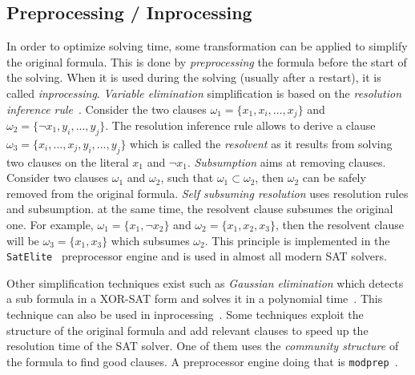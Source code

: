 \subsection{Preprocessing / Inprocessing}
In order to optimize solving time, some transformation can be applied to simplify the original formula.
This is done by \emph{preprocessing} the formula before the start of the solving.
When it is used during the solving (usually after a restart), it is called \emph{inprocessing}.
\emph{Variable elimination} simplification is based on the \emph{resolution inference rule}~\cite{robinson1965machine}.
Consider the two clauses $\omega_1 = \{x_1, x_i, ..., x_j \}$ and $\omega_2 = \{\neg x_1, y_i, ..., y_j\}$.
The resolution inference rule allows to derive a clause $\omega_3 = \{x_i, ..., x_j, y_i, ..., y_j\}$ which is called
the \emph{resolvent} as it results from solving two clauses on the literal $x_1$ and $\neg x_1$.
\emph{Subsumption} aims at removing  clauses. Consider two clauses $\omega_1$ and $\omega_2$, such that
$\omega_1 \subset  \omega_2$, then $\omega_2$ can be safely removed from the original formula.
\emph{Self subsuming resolution} uses resolution rules and subsumption. at the same time,
the resolvent clause subsumes the original one. For example, $\omega_1 = \{x_1, \neg x_2\}$ and $\omega_2 = \{x_1, x_2, x_3\}$,
 then the resolvent clause will be $\omega_3 = \{x_1, x_3\}$ which subsumes $\omega_2$. This principle
is implemented in the \texttt{SatElite}~\cite{een2005effective} preprocessor engine and is used in almost all modern SAT solvers.

Other simplification techniques exist such as \emph{Gaussian elimination} which detects a sub formula in a XOR-SAT
form and solves it in a polynomial time~\cite{moore2011nature}. This technique can also be used in inprocessing~\cite{soos2010enhanced}. 
Some techniques exploit the structure of the original formula and add relevant clauses to speed up the resolution
time of the SAT solver. One of them uses the \textit{community structure} of the formula to find good clauses.
A preprocessor engine doing that is \texttt{modprep}~\cite{ansotegui2015using}.
